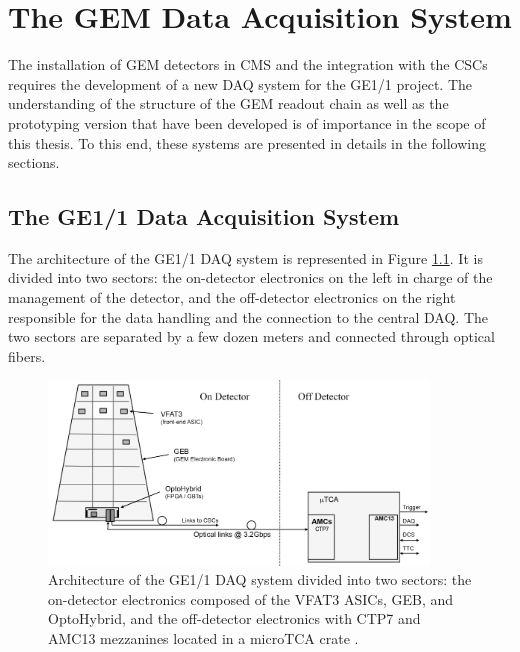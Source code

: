 \chapter{The GEM Data Acquisition System}
\label{chap:II-2-daq}

  The installation of GEM detectors in CMS and the integration with the CSCs requires the development of a new DAQ system for the GE1/1 project. The understanding of the structure of the GEM readout chain as well as the prototyping version that have been developed is of importance in the scope of this thesis. To this end, these systems are presented in details in the following sections. \\

  \section{The GE1/1 Data Acquisition System}

    The architecture of the GE1/1 DAQ system is represented in Figure \ref{fig:II-2-gem-system}. It is divided into two sectors: the on-detector electronics on the left in charge of the management of the detector, and the off-detector electronics on the right responsible for the data handling and the connection to the central DAQ. The two sectors are separated by a few dozen meters and connected through optical fibers. \\

    \begin{figure}[h!]
      \centering
      \includegraphics[width=0.9\textwidth]{img/II-2-daq/gem-system.pdf}
      \caption{Architecture of the GE1/1 DAQ system divided into two sectors: the on-detector electronics composed of the VFAT3 ASICs, GEB, and OptoHybrid, and the off-detector electronics with CTP7 and AMC13 mezzanines located in a microTCA crate \cite{Colaleo:2021453}.}
      \label{fig:II-2-gem-system}
    \end{figure}


